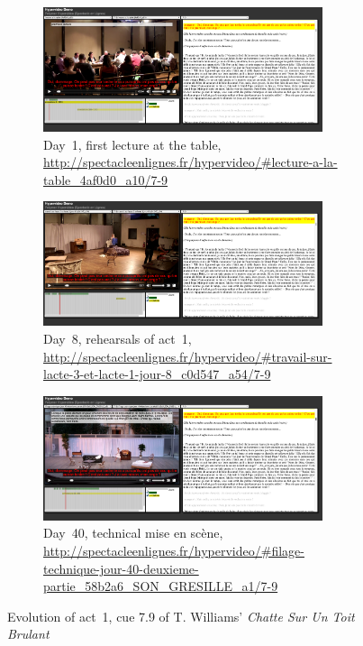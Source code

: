 \documentclass[runningheads,a4paper]{llncs}
\begin{document}
\begin{figure}
        \centering
        \begin{subfigure}[b]{\textwidth}
                \centering
                \includegraphics[width=0.9\textwidth]{spel1}
                \caption{Day~1, first lecture at the table,
                	\url{http://spectacleenlignes.fr/hypervideo/\#lecture-a-la-table_4af0d0_a10/7-9}}
                \label{fig:day1}
        \end{subfigure}
        
        \begin{subfigure}[b]{\textwidth}
                \centering
                \includegraphics[width=0.9\textwidth]{spel2}
                \caption{Day~8, rehearsals of act~1,
                	\url{http://spectacleenlignes.fr/hypervideo/\#travail-sur-lacte-3-et-lacte-1-jour-8_c0d547_a54/7-9}}
                \label{fig:day8}
        \end{subfigure}
        
        \begin{subfigure}[b]{\textwidth}
                \centering
                \includegraphics[width=0.9\textwidth]{spel3}
                \caption{Day~40, technical mise en scène,
                	\url{http://spectacleenlignes.fr/hypervideo/\#filage-technique-jour-40-deuxieme-partie_58b2a6_SON_GRESILLE_a1/7-9}}
                \label{fig:day40}
        \end{subfigure}
        \caption{Evolution of act~1, cue 7.9 of T. Williams' \emph{Chatte Sur Un Toit Brulant}}\label{fig:demoapp}
\end{figure}
\end{document}
